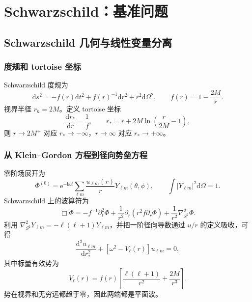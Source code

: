\documentclass[UTF8,fontset=fandol,12pt,a4paper,oneside,openany]{ctexrep}
\newcommand{\dd}{\mathrm d}
\newcommand{\ii}{\mathrm i}
\newcommand{\ee}{\mathrm e}
\newcommand{\abs}[1]{\left|#1\right|}
\begin{document}
\chapter{Schwarzschild：基准问题}
\section{Schwarzschild 几何与线性变量分离}
\label{sec:sch-linear}

\subsection{度规和 tortoise 坐标}

Schwarzschild 度规为
\begin{equation}
\dd s^2=-f(r)\dd t^2+f(r)^{-1}\dd r^2+r^2\dd\Omega^2,
\qquad f(r)=1-\frac{2M}{r}.
\end{equation}
视界半径 $r_h=2M$。定义 tortoise 坐标
\begin{equation}
\frac{\dd r_*}{\dd r}=\frac{1}{f},\qquad
r_*=r+2M\ln\left(\frac{r}{2M}-1\right),
\end{equation}
则 $r\to2M^+$ 对应 $r_*\to-\infty$，$r\to\infty$ 对应 $r_*\to+\infty$。

\subsection{从 Klein--Gordon 方程到径向势垒方程}

零阶场展开为
\begin{equation}
\Phi^{(0)}=\ee^{-\ii\omega t}
\sum_{\ell m}\frac{u_{\ell m}(r)}{r}Y_{\ell m}(\theta,\phi),
\qquad \int\abs{Y_{\ell m}}^2\dd\Omega=1.
\end{equation}
Schwarzschild 上的波算符为
\begin{equation}
\Box\Phi=-f^{-1}\partial_t^2\Phi
+\frac{1}{r^2}\partial_r(r^2f\partial_r\Phi)
+\frac{1}{r^2}\nabla_{S^2}^2\Phi.
\end{equation}
利用 $\nabla_{S^2}^2Y_{\ell m}=-\ell(\ell+1)Y_{\ell m}$，并把一阶径向导数通过 $u/r$ 的定义吸收，可得
\begin{equation}
\boxed{
\frac{\dd^2u_{\ell m}}{\dd r_*^2}
+\left[\omega^2-V_\ell(r)\right]u_{\ell m}=0,}
\label{eq:sch-rw}
\end{equation}
其中标量有效势为
\begin{equation}
V_\ell(r)=f(r)\left[
\frac{\ell(\ell+1)}{r^2}+\frac{2M}{r^3}
\right].
\label{eq:sch-pot}
\end{equation}
势在视界和无穷远都趋于零，因此两端都是平面波。
\end{document}
